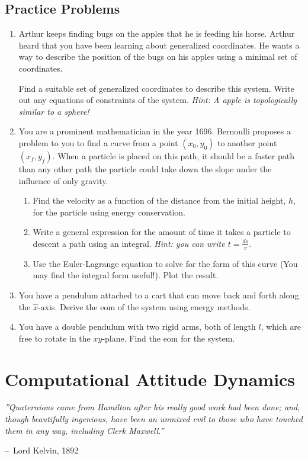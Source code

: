 \documentclass[12pt]{report}
\makeatletter
\newenvironment{chapquote}[2][2em]
  {\setlength{\@tempdima}{#1}%
   \def\chapquote@author{#2}%
   \parshape 1 \@tempdima \dimexpr\textwidth-2\@tempdima\relax%
   \itshape}
  {\par\normalfont\hfill--\ \chapquote@author\hspace*{\@tempdima}\par\bigskip}
\makeatother
\begin{document}
\section{Practice Problems}
\begin{enumerate}
    \item Arthur keeps finding bugs on the apples that he is feeding his horse. Arthur heard that you have been learning about generalized coordinates. He wants a way to describe the position of the bugs on his apples using a minimal set of coordinates.

Find a suitable set of generalized coordinates to describe this system. Write out any equations of constraints of the system. \textit{Hint: A apple is topologically similar to a sphere!}

    \item You are a prominent mathematician in the year 1696. Bernoulli proposes a problem to you to find a curve from a point $(x_0,y_0)$ to another point $\left(x_f,y_f\right)$. When a particle is placed on this path, it should be a faster path than any other path the particle could take down the slope under the influence of only gravity.
\begin{enumerate}
    \item Find the velocity as a function of the distance from the initial height, $h$, for the particle using energy conservation.
    \item Write a general expression for the amount of time it takes a particle to descent a path using an integral. \textit{Hint: you can write $t=\frac{ds}{v}$}.
    \item Use the Euler-Lagrange equation to solve for the form of this curve (You may find the integral form useful!). Plot the result.
\end{enumerate}

\item You have a pendulum attached to a cart that can move back and forth along the $\hat{x}$-axis. Derive the \gls{eom} of the system using energy methods.
\item You have a double pendulum with two rigid arms, both of length $l$, which are free to rotate in the $xy$-plane. Find the \gls{eom} for the system.

\end{enumerate}
\chapter{Computational Attitude Dynamics}\label{sec:attitude dynamics}
\begin{chapquote}{Lord Kelvin, 1892}
''Quaternions came from Hamilton after his really good work had been done; and, though beautifully ingenious, have been an unmixed evil to those who have touched them in any way, including Clerk Maxwell.''
\end{chapquote}
\end{document}
